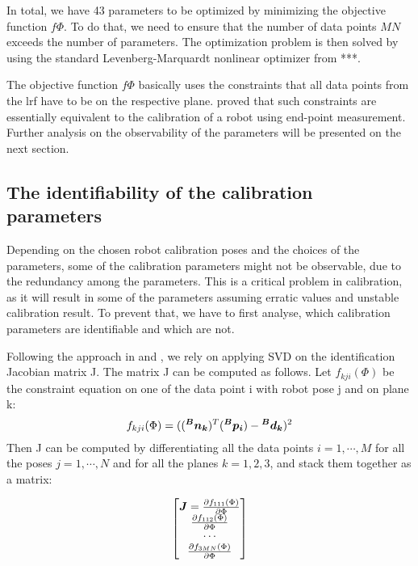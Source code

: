 In total, we have 43 parameters to be optimized by minimizing the objective function $f{\Phi}$. To do that, we need to ensure that the number of data points $MN$ exceeds the number of parameters. The optimization problem is then solved by using the standard Levenberg-Marquardt nonlinear optimizer from ***. 

The objective function $f{\Phi}$ basically uses the constraints that all data points from the \ac{lrf} have to be on the respective plane. \cite{Zhuang1999} proved that such constraints are essentially equivalent to the calibration of a robot using end-point measurement. Further analysis on the observability of the parameters will be presented on the next section. 

\subsection{The identifiability of the calibration parameters}
\label{sec:third_step}

Depending on the chosen robot calibration poses and the choices of the parameters, some of the calibration parameters might not be observable, due to the redundancy among the parameters. This is a critical problem in calibration, as it will result in some of the parameters assuming erratic values and unstable calibration result. To prevent that, we have to first analyse, which calibration parameters are identifiable and which are not. 

Following the approach in \cite{Hollerbach1996} and \cite{Joubair2015}, we rely on applying SVD on the identification Jacobian matrix J. The matrix J can be computed as follows. Let  $f_{kji}(\Phi)$ be the constraint equation on one of the data point i with robot pose j and on plane k:
\begin{equation}
 f_{kji}(\Phi) =  ((\vb*{{^B}n_k}) ^T (\vb*{{^B}p_i}) - \vb*{{^B}d_k})^2
\end{equation}
Then J can be computed by differentiating all the data points $i = 1, \cdots, M$ for all the poses $j = 1, \cdots, N$ and for all the planes $k=1,2,3$, and stack them together as a matrix:

\renewcommand\arraystretch{1.8}
\begin{equation}
	\begin{bmatrix}
 \vb*{J} = \frac{\partial f_{111}(\Phi)}{\partial\Phi}\\
 \frac{\partial f_{112}(\Phi)}{\partial\Phi}\\
 \cdots \\
 \frac{\partial f_{3MN}(\Phi)}{\partial\Phi}\\
	\end{bmatrix}
\end{equation}

